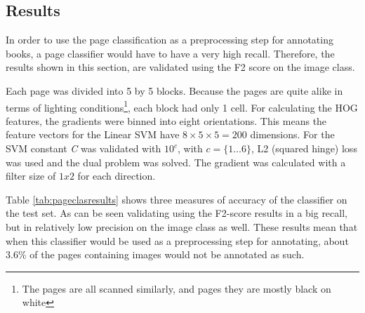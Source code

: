 \subsection{Results}
\label{subsec:pageclasresults}

In order to use the page classification as a preprocessing step for annotating
books, a page classifier would have to have a very high recall. Therefore, the
results shown in this section, are validated using the F2 score on the image
class. 

Each page was divided into 5 by 5 blocks. Because the pages
are quite alike in terms of lighting conditions\footnote{The pages are all scanned
similarly, and pages they are mostly black on white}, each block had only 1 cell. For
calculating the HOG features, the gradients were binned into eight orientations.
This means the feature vectors for the Linear SVM have $8 \times 5 \times 5 =
200$ dimensions. 
For the SVM constant \emph{C} was validated with $10^c$, with $c = \{1 \dots
6\}$, L2 (squared hinge) loss was used and the dual problem was solved. The
gradient was calculated with a filter size of $1x2$ for each direction.


Table \ref{tab:pageclasresults} shows three measures of accuracy of the
classifier on the test set. As can be seen validating using the F2-score
results in a big recall, but in relatively low precision on the image
class as well. These results mean that when this classifier would be used as a
preprocessing step for annotating, about $3.6\%$ of the pages containing images
would not be annotated as such.

